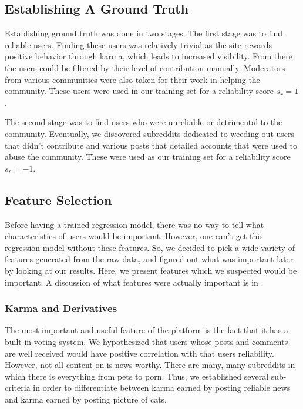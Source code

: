 
\subsection{Establishing A Ground Truth} %
\label{sub:establishing_a_ground_truth}
Establishing ground truth was done in two stages. The first stage was to find
reliable users. Finding these users was relatively trivial as the site rewards
positive behavior through karma, which leads to increased visibility. From there
the users could be filtered by their level of contribution manually. Moderators
from various communities were also taken for their work in helping the
community.  These users were used in our training set for a reliability score
$s_r = 1$.

The second stage was to find users who were unreliable or detrimental to the
community. Eventually, we discovered subreddits dedicated to weeding out users
that didn't contribute and various posts that detailed accounts that were used
to abuse the community. These were used as our training set for a reliability
score $s_r = -1$.


\subsection{Feature Selection} %
\label{sub:feature_selection}

Before having a trained regression model, there was no way to tell what
characteristics of \reddit{} users would be important. However, one can't get
this regression model without these features. So, we decided to pick a wide
variety of features generated from the raw data, and figured out what was
important later by looking at our results. Here, we present features which we
suspected would be important. A discussion of what features were actually
important is in .

\subsubsection{\reddit{} Karma and Derivatives} %
\label{ssub:reddit_karma_and_derivatives}

The most important and useful feature of the \reddit{} platform is the fact that
it has a built in voting system. We hypothesized that users whose posts and
comments are well received would have positive correlation with that users
reliability. However, not all content on \reddit{} is news-worthy. There are
many, many subreddits in which there is everything from pets to porn. Thus, we
established several sub-criteria in order to differentiate between karma earned
by posting reliable news and karma earned by posting picture of cats.

